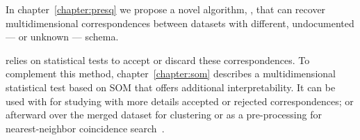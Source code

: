 In chapter~\ref{chapter:presq} we propose a novel algorithm, \PresQ, that can recover
multidimensional correspondences between datasets with different, undocumented --- or unknown --- schema.

\PresQ relies on statistical tests to accept or discard these correspondences.
To complement this method, chapter~\ref{chapter:som} describes a multidimensional
statistical test based on \gls{SOM} that offers additional interpretability. It can be used
with \PresQ for studying with more details accepted or rejected correspondences;
or afterward over the merged dataset for clustering or as a pre-processing for nearest-neighbor
coincidence search~\cite{silva2011som}.


